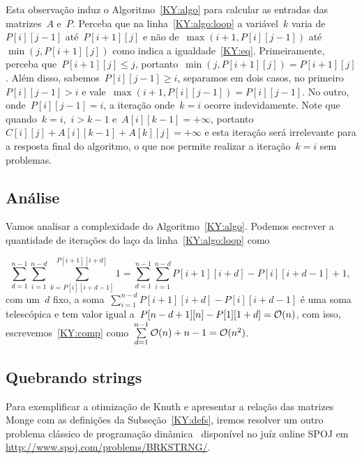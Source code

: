 Esta observação induz o Algoritmo~\ref{KY:algo} para calcular as entradas das matrizes~$A$ e~$P$. Perceba que na linha~\ref{KY:algo:loop} a variável~$k$ varia de~$P[i][j-1]$ até~$P[i+1][j]$ e não de~$\max(i+1,P[i][j-1])$ até~$\min(j,P[i+1][j])$ como indica a igualdade~\eqref{KY:eq}. Primeiramente, perceba que~$P[i+1][j] \leq j$, portanto~$\min(j,P[i+1][j]) = P[i+1][j]$. Além disso, sabemos~$P[i][j-1] \geq i$, separamos em dois casos, no primeiro~$P[i][j-1] > i$ e vale~$\max(i+1,P[i][j-1]) = P[i][j-1]$. No outro, onde~$P[i][j-1] = i$, a iteração onde~$k=i$ ocorre indevidamente. Note que quando~$k = i$,~$i > k-1$ e~$A[i][k-1] = +\infty$, portanto~$C[i][j] + A[i][k-1] + A[k][j] = +\infty$ e esta iteração será irrelevante para a resposta final do algoritmo, o que nos permite realizar a iteração~$k=i$ sem problemas.


\subsection{Análise}

Vamos analisar a complexidade do Algoritmo~\ref{KY:algo}. Podemos escrever a quantidade de iterações do laço da linha~\ref{KY:algo:loop} como

\begin{equation} \label{KY:comp}
{\sum\limits_{d = 1}^{n-1} \sum\limits_{i=1}^{n-d} \sum\limits_{k=P[i][i+d-1]}^{P[i+1][i+d]} 1 = \sum\limits_{d = 1}^{n-1} \sum\limits_{i=1}^{n-d} P[i+1][i+d] - P[i][i+d-1] + 1} \text{, }
\end{equation}
com um~$d$ fixo, a soma~$\sum\limits_{i=1}^{n-d} P[i+1][i+d] - P[i][i+d-1]$ é uma soma telescópica e tem valor igual a~$P[n-d+1][n] - P[1][1+d] = \mathcal{O}(n)$, com isso, escrevemos~\eqref{KY:comp} como~$\sum\limits_{d=1}^{n-1} \mathcal{O}(n) + n - 1 = \mathcal{O}(n^2)$.


\subsection{Quebrando strings}

Para exemplificar a otimização de Knuth e apresentar a relação das matrizes Monge com as definições da Subseção~\ref{KY:defs}, iremos resolver um outro problema clássico de programação dinâmica~\cite[Exercício~15-9]{CLRS} disponível no juíz online SPOJ em \url{http://www.spoj.com/problems/BRKSTRNG/}. 

